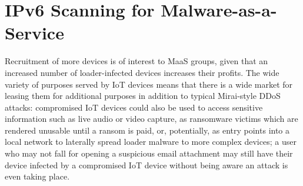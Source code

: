\documentclass[10pt,sigconf]{acmart}
\begin{document}
\section{IPv6 Scanning for Malware-as-a-Service}

Recruitment of more devices is of interest to MaaS groups, given that an increased number of loader-infected devices increases their profits.
The wide variety of purposes served by IoT devices means that there is a wide market for leasing them for additional purposes in addition to typical Mirai-style DDoS attacks:
compromised IoT devices could also be used to access sensitive information such as live audio or video capture, as ransomware victims which are rendered unusable until a ransom is paid, or, potentially, as entry points into a local network to laterally spread loader malware to more complex devices;
a user who may not fall for opening a suspicious email attachment may still have their device infected by a compromised IoT device without being aware an attack is even taking place.
\end{document}
